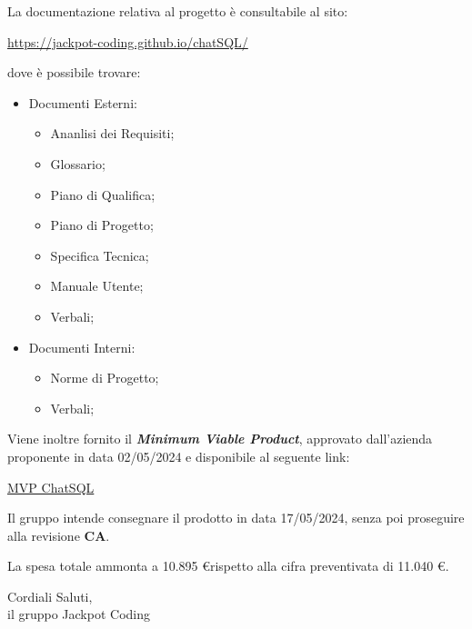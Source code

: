 \documentclass[5pt]{article}
\begin{document}
\begin{flushleft}
La documentazione relativa al progetto è consultabile al sito:
\begin{center}
	\href{https://jackpot-coding.github.io/chatSQL/}{https://jackpot-coding.github.io/chatSQL/}
\end{center}
dove è possibile trovare:
\begin{itemize}
	\item Documenti Esterni:
	\begin{itemize}
		\item Ananlisi dei Requisiti;
		\item Glossario;
		\item Piano di Qualifica;
		\item Piano di Progetto;
		\item Specifica Tecnica;
		\item Manuale Utente;
		\item Verbali;
	\end{itemize}
	\item Documenti Interni:
	\begin{itemize}
		\item Norme di Progetto;
		\item Verbali;
	\end{itemize}
\end{itemize}
\end{flushleft}

\begin{flushleft}
Viene inoltre fornito il \textbf{\textit{Minimum Viable Product}}, approvato dall'azienda proponente in data 02/05/2024 e disponibile al seguente link:
\begin{center}
	\href{https://github.com/Jackpot-Coding/chatSQL/tree/main/src/chatSQL}{MVP ChatSQL}
\end{center}
\end{flushleft}

\begin{flushleft}
Il gruppo intende consegnare il prodotto in data 17/05/2024, senza poi proseguire alla revisione \textbf{CA}.

La spesa totale ammonta a 10.895 \euro \space rispetto alla cifra preventivata di 11.040 \euro.
\end{flushleft}

\vspace{8mm}

\begin{flushright}
	Cordiali Saluti,\\
	il gruppo Jackpot Coding
\end{flushright}
	
\end{document}
